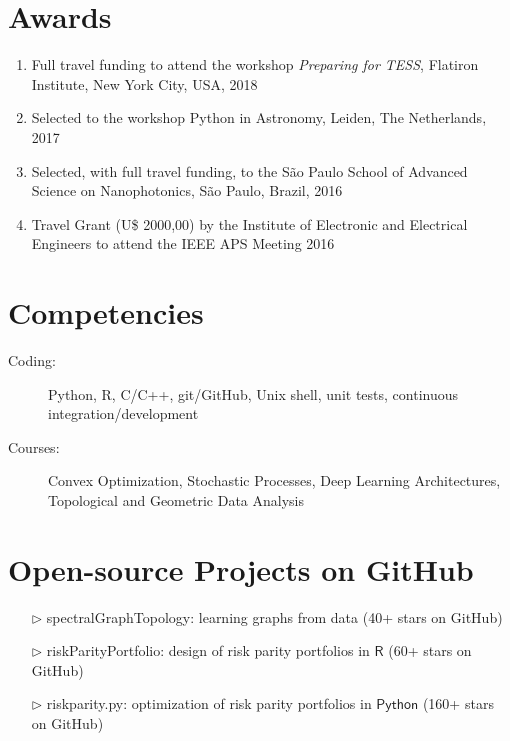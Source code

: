 \documentclass[10pt]{article}
\begin{document}
\begin{titlepage}
\section*{Awards}
\begin{enumerate}
  \item Full travel funding to attend the workshop \textit{Preparing for TESS}, Flatiron Institute, New York City, USA, 2018
  \item Selected to the workshop \textsf{Python} in Astronomy, Leiden, The Netherlands, 2017
  \item Selected, with full travel funding, to the S\~ao Paulo School of Advanced Science on Nanophotonics, S\~ao Paulo, Brazil, 2016
  \item Travel Grant (U\$ 2000,00) by the Institute of Electronic and Electrical Engineers to attend the IEEE APS Meeting 2016
\end{enumerate}


\section*{Competencies}
\begin{description}
  \item[Coding:] \textsf{Python}, \textsf{R}, \textsf{C/C++}, git/GitHub, Unix shell, unit tests, continuous integration/development
  \item[Courses:] Convex Optimization, Stochastic Processes, Deep Learning Architectures, Topological and Geometric Data Analysis
\end{description}

\section*{Open-source Projects on GitHub}

  \begin{itemize}
    \item[$\triangleright$] \textsf{spectralGraphTopology}: learning graphs from data (40+ stars on GitHub)
    \item[$\triangleright$] \textsf{riskParityPortfolio}: design of risk parity portfolios in $\textsf{R}$ (60+ stars on GitHub)
    \item[$\triangleright$] \textsf{riskparity.py}: optimization of risk parity portfolios in $\textsf{Python}$ (160+ stars on GitHub)
  \end{itemize}

\end{titlepage}
\end{document}

